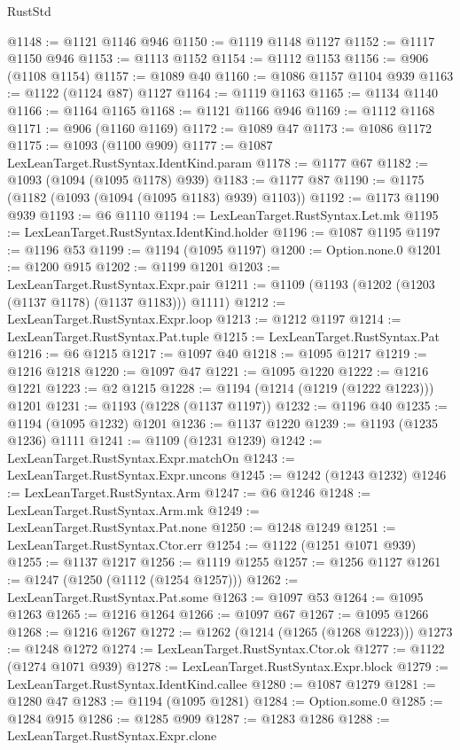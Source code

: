 \begin{lexlean}{RustStd}
\begin{coremodule}
@1148 := @1121 @1146 @946
@1150 := @1119 @1148 @1127
@1152 := @1117 @1150 @946
@1153 := @1113 @1152
@1154 := @1112 @1153
@1156 := @906 (@1108 @1154)
@1157 := @1089 @40
@1160 := @1086 @1157 @1104 @939
@1163 := @1122 (@1124 @87) @1127
@1164 := @1119 @1163
@1165 := @1134 @1140
@1166 := @1164 @1165
@1168 := @1121 @1166 @946
@1169 := @1112 @1168
@1171 := @906 (@1160 @1169)
@1172 := @1089 @47
@1173 := @1086 @1172
@1175 := @1093 (@1100 @909)
@1177 := @1087 LexLeanTarget.RustSyntax.IdentKind.param
@1178 := @1177 @67
@1182 := @1093 (@1094 (@1095 @1178) @939)
@1183 := @1177 @87
@1190 := @1175 (@1182 (@1093 (@1094 (@1095 @1183) @939) @1103))
@1192 := @1173 @1190 @939
@1193 := @6 @1110
@1194 := LexLeanTarget.RustSyntax.Let.mk
@1195 := LexLeanTarget.RustSyntax.IdentKind.holder
@1196 := @1087 @1195
@1197 := @1196 @53
@1199 := @1194 (@1095 @1197)
@1200 := Option.none.{0}
@1201 := @1200 @915
@1202 := @1199 @1201
@1203 := LexLeanTarget.RustSyntax.Expr.pair
@1211 := @1109 (@1193 (@1202 (@1203 (@1137 @1178) (@1137 @1183))) @1111)
@1212 := LexLeanTarget.RustSyntax.Expr.loop
@1213 := @1212 @1197
@1214 := LexLeanTarget.RustSyntax.Pat.tuple
@1215 := LexLeanTarget.RustSyntax.Pat
@1216 := @6 @1215
@1217 := @1097 @40
@1218 := @1095 @1217
@1219 := @1216 @1218
@1220 := @1097 @47
@1221 := @1095 @1220
@1222 := @1216 @1221
@1223 := @2 @1215
@1228 := @1194 (@1214 (@1219 (@1222 @1223))) @1201
@1231 := @1193 (@1228 (@1137 @1197))
@1232 := @1196 @40
@1235 := @1194 (@1095 @1232) @1201
@1236 := @1137 @1220
@1239 := @1193 (@1235 @1236) @1111
@1241 := @1109 (@1231 @1239)
@1242 := LexLeanTarget.RustSyntax.Expr.matchOn
@1243 := LexLeanTarget.RustSyntax.Expr.uncons
@1245 := @1242 (@1243 @1232)
@1246 := LexLeanTarget.RustSyntax.Arm
@1247 := @6 @1246
@1248 := LexLeanTarget.RustSyntax.Arm.mk
@1249 := LexLeanTarget.RustSyntax.Pat.none
@1250 := @1248 @1249
@1251 := LexLeanTarget.RustSyntax.Ctor.err
@1254 := @1122 (@1251 @1071 @939)
@1255 := @1137 @1217
@1256 := @1119 @1255
@1257 := @1256 @1127
@1261 := @1247 (@1250 (@1112 (@1254 @1257)))
@1262 := LexLeanTarget.RustSyntax.Pat.some
@1263 := @1097 @53
@1264 := @1095 @1263
@1265 := @1216 @1264
@1266 := @1097 @67
@1267 := @1095 @1266
@1268 := @1216 @1267
@1272 := @1262 (@1214 (@1265 (@1268 @1223)))
@1273 := @1248 @1272
@1274 := LexLeanTarget.RustSyntax.Ctor.ok
@1277 := @1122 (@1274 @1071 @939)
@1278 := LexLeanTarget.RustSyntax.Expr.block
@1279 := LexLeanTarget.RustSyntax.IdentKind.callee
@1280 := @1087 @1279
@1281 := @1280 @47
@1283 := @1194 (@1095 @1281)
@1284 := Option.some.{0}
@1285 := @1284 @915
@1286 := @1285 @909
@1287 := @1283 @1286
@1288 := LexLeanTarget.RustSyntax.Expr.clone

\end{coremodule}
\end{lexlean}

